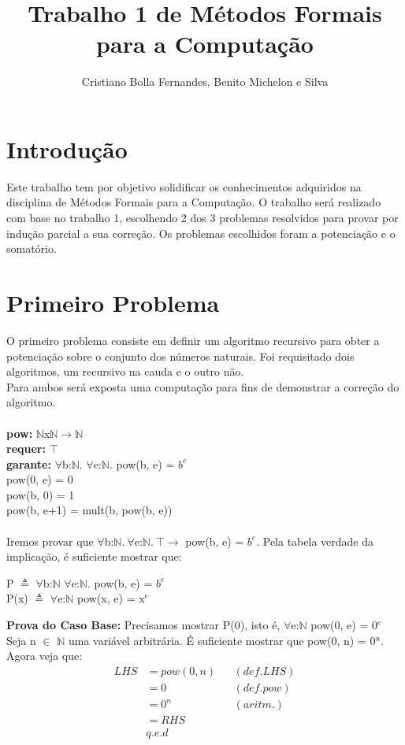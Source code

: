 \documentclass{article}
\title{Trabalho 1 de Métodos Formais para a Computação}
\author{Cristiano Bolla Fernandes, Benito Michelon e Silva}
\begin{document}
\maketitle

\section{Introdução}
Este trabalho tem por objetivo solidificar os conhecimentos adquiridos na disciplina de Métodos Formais para a Computação.
O trabalho será realizado com base no trabalho 1, escolhendo 2 dos 3 problemas resolvidos para provar por indução parcial a sua correção.
Os problemas escolhidos foram a potenciação e o somatório.

\section{Primeiro Problema}
O primeiro problema consiste em definir um algoritmo recursivo para obter a potenciação sobre o conjunto dos números naturais.
Foi requisitado dois algoritmos, um recursivo na cauda e o outro não.\\
Para ambos será exposta uma computação para fins de demonstrar a correção do algoritmo.\\
\\
\textbf{pow:} $\mathbb{N}$x$\mathbb{N}$$ \rightarrow \mathbb{N}$\\
\textbf{requer:} $\top$\\
\textbf{garante:} $\forall$b:$\mathbb{N}$. $\forall$e:$\mathbb{N}$. pow(b, e) = $b^e$\\
pow(0, e) = 0\\
pow(b, 0) = 1\\
pow(b, e+1) = mult(b, pow(b, e))\\
\\
Iremos provar que $\forall$b:$\mathbb{N}.\:\forall$e:$\mathbb{N}.\:\top\rightarrow$ pow(b, e) = $b^e$. Pela tabela verdade da implicação, é suficiente mostrar que:\\
\begin{center}
P $\triangleq$ $\forall$b:$\mathbb{N}$ $\forall$e:$\mathbb{N}$. pow(b, e) = $b^e$\\
P(x) $\triangleq$ $\forall$e:$\mathbb{N}$ pow(x, e) = x$^e$\\
\end{center}
\textbf{Prova do Caso Base:} Precisamos mostrar P(0), isto é, $\forall$e:$\mathbb{N}$ pow(0, e) = 0$^e$\\
Seja n $\in$ $\mathbb{N}$ uma variável arbitrária. É suficiente mostrar que pow(0, n) = 0$^n$.\\
Agora veja que:
\begin{align*}
LHS &= pow(0, n) && (def. LHS)\\
&= 0 && (def. pow)\\
&= 0^n && (aritm.)\\
&= RHS\\
& q.e.d
\end{align*}
\end{document}
